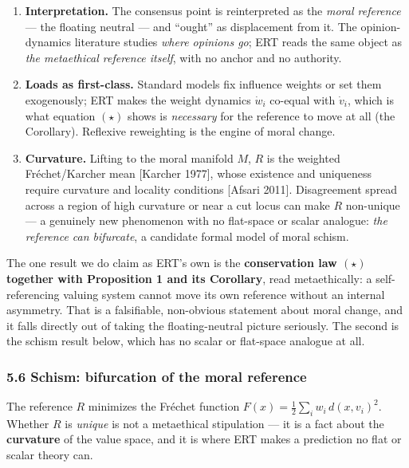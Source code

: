 \documentclass[
]{article}
\providecommand{\tightlist}{%
  \setlength{\itemsep}{0pt}\setlength{\parskip}{0pt}}
\begin{document}
\begin{enumerate}
\def\labelenumi{\arabic{enumi}.}
\tightlist
\item
  \textbf{Interpretation.} The consensus point is reinterpreted as the
  \emph{moral reference} --- the floating neutral --- and ``ought'' as
  displacement from it. The opinion-dynamics literature studies
  \emph{where opinions go}; ERT reads the same object as \emph{the
  metaethical reference itself}, with no anchor and no authority.
\item
  \textbf{Loads as first-class.} Standard models fix influence weights
  or set them exogenously; ERT makes the weight dynamics \(\dot w_i\)
  co-equal with \(\dot v_i\), which is what equation \((\star)\) shows
  is \emph{necessary} for the reference to move at all (the Corollary).
  Reflexive reweighting is the engine of moral change.
\item
  \textbf{Curvature.} Lifting to the moral manifold \(M\), \(R\) is the
  weighted Fréchet/Karcher mean {[}Karcher 1977{]}, whose existence and
  uniqueness require curvature and locality conditions {[}Afsari
  2011{]}. Disagreement spread across a region of high curvature or near
  a cut locus can make \(R\) non-unique --- a genuinely new phenomenon
  with no flat-space or scalar analogue: \emph{the reference can
  bifurcate}, a candidate formal model of moral schism.
\end{enumerate}

The one result we do claim as ERT's own is the \textbf{conservation law
\((\star)\) together with Proposition 1 and its Corollary}, read
metaethically: a self-referencing valuing system cannot move its own
reference without an internal asymmetry. That is a falsifiable,
non-obvious statement about moral change, and it falls directly out of
taking the floating-neutral picture seriously. The second is the schism
result below, which has no scalar or flat-space analogue at all.

\subsubsection{5.6 Schism: bifurcation of the moral
reference}\label{schism-bifurcation-of-the-moral-reference}

The reference \(R\) minimizes the Fréchet function
\(F(x) = \tfrac12\sum_i w_i\, d(x, v_i)^2\). Whether \(R\) is
\emph{unique} is not a metaethical stipulation --- it is a fact about
the \textbf{curvature} of the value space, and it is where ERT makes a
prediction no flat or scalar theory can.
\end{document}
